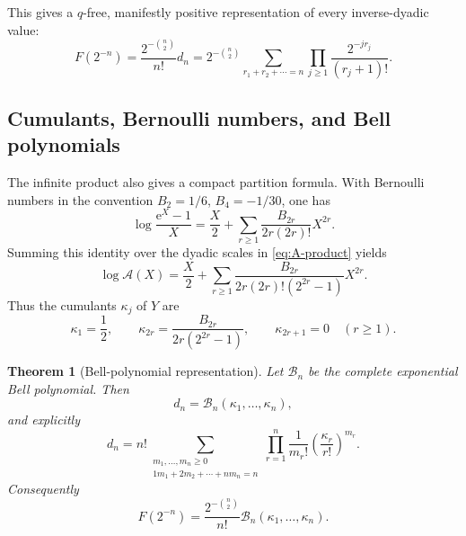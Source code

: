 \documentclass[11pt,oneside]{article}
\newtheorem{theorem}{Theorem}[section]
\theoremstyle{definition}
\theoremstyle{remark}
\newcommand{\e}{\mathrm e}
\begin{document}
This gives a $q$-free, manifestly positive representation of every inverse-dyadic value:
\begin{equation}
 F(2^{-n})=\frac{2^{-\binom n2}}{n!}d_n
 =2^{-\binom n2}
 \sum_{r_1+r_2+\cdots=n}
 \prod_{j\ge1}\frac{2^{-jr_j}}{(r_j+1)!}.                \label{eq:inverse-composition}
\end{equation}

\subsection{Cumulants, Bernoulli numbers, and Bell polynomials}

The infinite product also gives a compact partition formula.  With Bernoulli numbers in the
convention $B_2=1/6$, $B_4=-1/30$, one has
\begin{equation}
 \log\frac{\e^X-1}{X}
 =\frac X2+\sum_{r\ge1}\frac{B_{2r}}{2r(2r)!}X^{2r}.      \label{eq:log-exprel}
\end{equation}
Summing this identity over the dyadic scales in \eqref{eq:A-product} yields
\begin{equation}
 \log\mathscr A(X)
 =\frac X2+
  \sum_{r\ge1}
  \frac{B_{2r}}{2r(2r)!(2^{2r}-1)}X^{2r}.                 \label{eq:log-A}
\end{equation}
Thus the cumulants $\kappa_j$ of $Y$ are
\begin{equation}
 \kappa_1=\frac12,\qquad
 \kappa_{2r}=\frac{B_{2r}}{2r(2^{2r}-1)},\qquad
 \kappa_{2r+1}=0\quad(r\ge1).                            \label{eq:Y-cumulants}
\end{equation}

\begin{theorem}[Bell-polynomial representation]
\label{thm:bell-d}
Let $\mathcal B_n$ be the complete exponential Bell polynomial.  Then
\begin{equation}
 d_n=\mathcal B_n(\kappa_1,\ldots,\kappa_n),               \label{eq:bell-d}
\end{equation}
and explicitly
\begin{equation}
 d_n=n!\!
 \sum_{\substack{m_1,\ldots,m_n\ge0\\
                  1m_1+2m_2+\cdots+nm_n=n}}
 \prod_{r=1}^{n}\frac1{m_r!}
 \left(\frac{\kappa_r}{r!}\right)^{m_r}.                 \label{eq:partition-d}
\end{equation}
Consequently
\begin{equation}
 \boxed{
 F(2^{-n})=\frac{2^{-\binom n2}}{n!}
 \mathcal B_n(\kappa_1,\ldots,\kappa_n).}                 \label{eq:inverse-bell}
\end{equation}
\end{theorem}
\end{document}
